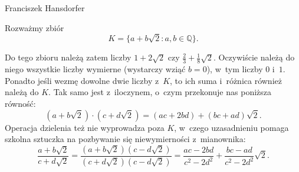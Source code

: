 




\vfill
{}
{Franciszek Hansdorfer}



Rozważmy zbiór 
\[K= \{a+b\sqrt{2} : a,b \in \mathbb Q\}.\]

Do tego zbioru należą zatem liczby $1+2\sqrt{2}$ czy
$\frac{2}{3}+\frac{1}{8}\sqrt{2}$. Oczywiście należą do niego wszystkie liczby
wymierne (wystarczy wziąć $b=0$), w~tym liczby $0$ i~$1$. Ponadto jeśli wezmę dowolne dwie
liczby z~$K$, to ich suma i~różnica również należą do $K$. Tak samo jest
z~iloczynem, o~czym przekonuje nas poniższa równość: \begin{equation*}
(a+b\sqrt{2})\cdot (c+d\sqrt{2})= (ac+2bd) + (bc+ad)\sqrt{2}.
\end{equation*}
%
Operacja dzielenia też nie wyprowadza poza $K$, w~czego uzasadnieniu pomaga szkolna sztuczka na
pozbywanie się niewymierności z~mianownika:
\begin{equation*}
\frac{a+b\sqrt{2}}{c+d\sqrt{2}}= 
\frac{(a+b\sqrt{2})(c-d\sqrt{2})}{(c+d\sqrt{2})(c-d\sqrt{2})}= 
\frac{ac-2bd}{c^2-2d^2} + \frac{bc-ad}{c^2-2d^2}\sqrt{2}.
\end{equation*}

